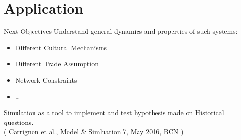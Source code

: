 \documentclass[12pt, notes=show]{beamer}
\begin{document}
\section{Application}
\begin{frame}{Next Objectives}
    \vfill
    Understand general dynamics and properties of such systems:
    \vfill
	\begin{itemize}
	\item Different Cultural Mechanisms
    \vfill
	\item Different Trade Assumption
    \vfill
	\item Network Constraints
    \vfill
	\item \dots
    \vfill
	\end{itemize}
\end{frame}

\begin{frame}{}

    {\large Simulation as a tool to implement and test hypothesis made on Historical questions.}\\
    \vspace{.5cm}
	{\scriptsize( Carrignon et al., Model \& Simluation 7, May 2016, BCN )}
	
\end{frame}
\end{document}
